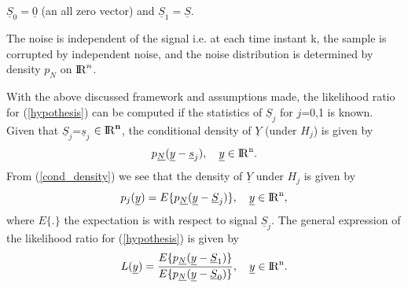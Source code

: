 \documentclass[a4paper,english,12pt]{article}
\begin{document}
\begin{assum}
$\underline{S}_{0}=\underline{0}$ (an all zero vector) and $\underline{S}_{1}=\underline{S}$.
\end{assum}

\begin{assum}
The noise is independent of the signal i.e. at each time instant k, the sample is corrupted by independent noise, and the noise distribution is determined by density $p_{N}$ on ${\rm I\!R}^{n}$.
\end{assum}

With the above discussed framework and assumptions made, the likelihood ratio for (\ref{hypothesis}) can be computed if the statistics of $\underline{S}_{j}$ for $j$=0,1 is known. Given that $\underline{S}_{j}$=$\underline{s}_{j}$ $\in {\rm I\!R}^{\textbf{n}}$, the conditional density of $\underline{Y}$ (under $H_{j}$) is given by 
\begin{equation}
\label{cond_density}
p_{\underline{N}}(\underline{y}-\underline{s}_{j}),\hspace{10pt}\underline{y}\in{\rm I\!R}^{\text{n}}.
\end{equation}
From (\ref{cond_density}) we see that the density of $\underline{Y}$ under $H_{j}$ is given by
\begin{equation}
\label{density}
p_{j}(\underline{y})=E\{p_{\underline{N}}(\underline{y}-\underline{S}_{j})\},\hspace{10pt}\underline{y}\in{\rm I\!R}^{\text{n}},
\end{equation}
where $E\{.\}$ the expectation is with respect to signal $\underline{S}_{j}$. The general expression of the likelihood ratio for (\ref{hypothesis}) is given by
\begin{equation}
\label{L(y)}
L(\underline{y})=\frac{E\{p_{\underline{N}}(\underline{y}-\underline{S}_{1})\}}{E\{p_{\underline{N}}(\underline{y}-\underline{S}_{0})\}},\hspace{10pt}\underline{y}\in{\rm I\!R}^{\text{n}}.
\end{equation}
\end{document}
